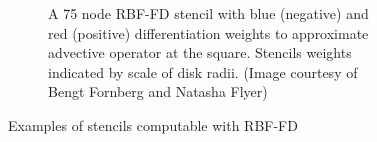 \documentclass[11pt]{report}
\begin{document}
{\begin{figure}[htbp]
\begin{subfigure}[m]{0.35\textwidth}
		\caption{A 75 node RBF-FD stencil with blue (negative) and red (positive) differentiation weights to approximate advective operator at the square. Stencils weights indicated by scale of disk radii. (Image courtesy of Bengt Fornberg and Natasha Flyer)}
		\label{fig:stencil_example_sphere}
	\end{subfigure}
	\caption{Examples of stencils computable with RBF-FD}
	\label{fig:stencil_example}
\end{figure}






}
\end{document}
